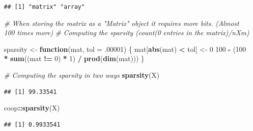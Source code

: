 \documentclass[
]{article}
\newenvironment{Shaded}{\begin{snugshade}}{\end{snugshade}}
\newcommand{\AttributeTok}[1]{\textcolor[rgb]{0.13,0.29,0.53}{#1}}
\newcommand{\CommentTok}[1]{\textcolor[rgb]{0.56,0.35,0.01}{\textit{#1}}}
\newcommand{\ControlFlowTok}[1]{\textcolor[rgb]{0.13,0.29,0.53}{\textbf{#1}}}
\newcommand{\DecValTok}[1]{\textcolor[rgb]{0.00,0.00,0.81}{#1}}
\newcommand{\FunctionTok}[1]{\textcolor[rgb]{0.13,0.29,0.53}{\textbf{#1}}}
\newcommand{\NormalTok}[1]{#1}
\newcommand{\OtherTok}[1]{\textcolor[rgb]{0.56,0.35,0.01}{#1}}
\newcommand{\SpecialCharTok}[1]{\textcolor[rgb]{0.81,0.36,0.00}{\textbf{#1}}}
\begin{document}
\begin{verbatim}
## [1] "matrix" "array"
\end{verbatim}

\begin{Shaded}
\begin{Highlighting}[]
\CommentTok{\# When storing the matrix as a "Matrix" object it requires more bits. (Almost 100 times more)}
\CommentTok{\# Computing the sparsity (count(0 entries in the matrix)/nXm)}


\NormalTok{sparsity }\OtherTok{\textless{}{-}} \ControlFlowTok{function}\NormalTok{(mat, }\AttributeTok{tol =}\NormalTok{ .}\DecValTok{00001}\NormalTok{) \{}
\NormalTok{    mat[}\FunctionTok{abs}\NormalTok{(mat) }\SpecialCharTok{\textless{}}\NormalTok{ tol] }\OtherTok{\textless{}{-}} \DecValTok{0}
    \DecValTok{100} \SpecialCharTok{{-}}\NormalTok{ (}\DecValTok{100} \SpecialCharTok{*} \FunctionTok{sum}\NormalTok{((mat }\SpecialCharTok{!=} \DecValTok{0}\NormalTok{) }\SpecialCharTok{*} \DecValTok{1}\NormalTok{) }\SpecialCharTok{/} \FunctionTok{prod}\NormalTok{(}\FunctionTok{dim}\NormalTok{(mat)))}
\NormalTok{\}}

\CommentTok{\# Computing the sparsity in two ways}
\FunctionTok{sparsity}\NormalTok{(X)}
\end{Highlighting}
\end{Shaded}

\begin{verbatim}
## [1] 99.33541
\end{verbatim}

\begin{Shaded}
\begin{Highlighting}[]
\NormalTok{coop}\SpecialCharTok{::}\FunctionTok{sparsity}\NormalTok{(X)}
\end{Highlighting}
\end{Shaded}

\begin{verbatim}
## [1] 0.9933541
\end{verbatim}
\end{document}
